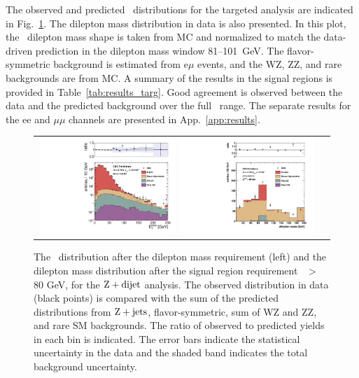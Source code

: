 \clearpage

The observed and predicted \MET\ distributions for the targeted analysis are indicated in Fig.~\ref{fig:results_targ}. 
The dilepton mass distribution in data is also presented. In this plot, the \zjets\ dilepton mass shape is taken from MC
and normalized to match the data-driven prediction in the dilepton mass window 81--101~GeV. The flavor-symmetric background
is estimated from e$\mu$ events, and the WZ, ZZ, and rare backgrounds are from MC.
A summary of the results in the signal regions is provided in Table~\ref{tab:results_targ}. 
Good agreement is observed between the data and the predicted background over the full \MET\ range.
The separate results for the ee and $\mu\mu$ channels are presented in App.~\ref{app:results}.

\begin{figure}[!h]
\begin{center}
\begin{tabular}{cc}
\includegraphics[width=0.49\textwidth]{plots/pfmet_bveto_all_19p5fb.pdf} %
\includegraphics[width=0.49\textwidth]{plots/mll_met80.pdf}
\end{tabular}
\caption{The \MET\ distribution after the dilepton mass requirement (left) and the dilepton mass distribution after the signal region requirement \MET\ $>$ 80 GeV, 
for the $\rm{Z}+{dijet}$ analysis. The observed distribution in data
(black points) is compared with the sum of the predicted distributions from $\rm{Z}+\rm{jets}$, flavor-symmetric, sum of WZ and ZZ, and rare SM backgrounds. 
The ratio of observed to predicted yields in each bin is
indicated. The error bars indicate the statistical uncertainty in the data and the shaded band indicates the total background uncertainty.
\label{fig:results_targ}
}
\end{center}
\end{figure}



